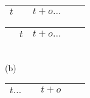 \begin{minipage}[t]{0.5\textwidth}
\begin{center}
\begin{tabular}{ |c|c|c|c|c } 
 \hline
 $t$ & \hspace*{1cm}  & $t + o \dots$ & \hspace*{2cm} \\ 
 \hline 
\end{tabular} 
\begin{tabular}{ |c|c|c|c|c }
 \hline 
 \hspace*{1cm} & $t$ & $t + o \dots$ & \hspace*{2cm} \\ 
 \hline
\end{tabular}
\\
(b) 
\\[0.1in]
\begin{tabular}{ |c|c|c|c|c| } 
 \hline
 $t \dots$ & \hspace*{1cm}  & $t + o$ & \hspace*{2cm} \\ 
 \hline 
\end{tabular} 


\end{center}
\end{minipage}
